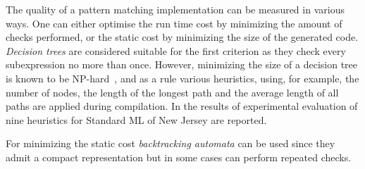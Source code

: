 \begin{comment}
\begin{figure}[ht]
\begin{minipage}[b]{0.3\linewidth}
\centering
\label{fig:figure1}
\end{minipage}
\hspace{0.5cm}
\begin{minipage}[b]{0.3\linewidth}
\centering
\begin{lstlisting}
switch x with 
| true -> 
    switch y with 
    | true -> 
       switch z with 
       | true -> 4
       | _ -> 3
    | _ -> 
      switch z with 
      | true -> 1
      | _ -> 3 
| _ -> 
   switch y with 
   | true -> 2 
   | _ -> if z then 1 else 3
\end{lstlisting}
\end{minipage}
\hspace{0.5cm}
\begin{minipage}[b]{0.3\linewidth}
\centering
\end{minipage}
\end{figure}
\end{comment}



The quality of a pattern matching implementation can be measured in various ways. One can either optimise the run time cost by minimizing the amount of checks performed, or the static
cost by minimizing the size of the generated code. \emph{Decision trees}
are considered suitable for the first criterion as they check every subexpression no more than once.
However, minimizing the size of a decision tree is known to be NP-hard~\cite{baudinet1985tree}, and as a rule various heuristics, using, for example,
the number of nodes, the length of the longest path and the average length of all paths are applied during compilation. In \cite{Scott2000WhenDM} the results of experimental
evaluation of nine heuristics for Standard ML of New Jersey are reported.

For minimizing the static cost \emph{backtracking automata} can be used since they admit a compact representation but in some cases can perform repeated checks.

